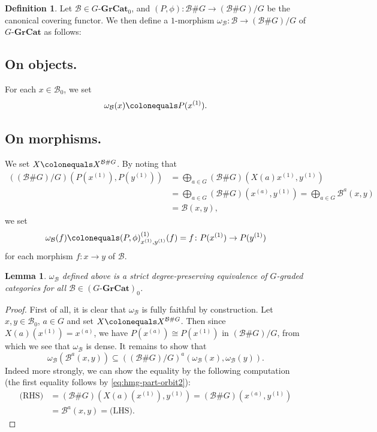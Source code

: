 \documentclass{surv-l}
\numberwithin{equation}{chapter}
\numberwithin{figure}{chapter}
\theoremstyle{plain}
\newtheorem{lem}[thm]{Lemma}
\theoremstyle{definition}
\newtheorem{dfn}[thm]{Definition}
\theoremstyle{remark}
\newcommand{\GGrCat}{G\text{-}\mathbf{GrCat}}
\begin{document}
\begin{dfn}
\label{dfn:omega}
Let $\mathcal{B}\in\GGrCat_0$, and
$(P,\phi)\colon\mathcal{B}\#G\to(\mathcal{B}\#G)/G$ be
the canonical covering functor.
We then define a $1$-morphism
$\omega_{\mathcal{B}}\colon\mathcal{B}\to(\mathcal{B}\#G)/G$
of $\GGrCat$ as follows:

\subsection*{On objects.}
For each $x\in\mathcal{B}_0$, we set
\[
\omega_{\mathcal{B}}(x)\colonequals P(x^{(1)}).
\]
\subsection*{On morphisms.}
We set
$X\colonequals  X^{\mathcal{B}\# G}$.
By noting that
\[
\begin{aligned}
((\mathcal{B}\# G)/G)(P(x^{(1)}), P(y^{(1)})) &=\bigoplus_{a \in G}(\mathcal{B}\# G)(X(a)x^{(1)}, y^{(1)})\\
&=\bigoplus_{a \in G}(\mathcal{B}\# G)(x^{(a)}, y^{(1)})
= \bigoplus_{a\in G} \mathcal{B}^{a}(x, y)\\
&= \mathcal{B}(x, y),
\end{aligned}
\]
we set
\[
\omega_{\mathcal{B}}(f)\colonequals  (P, \phi)_{x^{(1)},y^{(1)}}^{(1)}(f) = f
\colon P(x^{(1)}) \to P(y^{(1)})
\]
for each morphism $f\colon x\to y$ of $\mathcal{B}$.
\end{dfn}

\begin{lem}\label{lem:om_B-strict}
$\omega_{\mathcal{B}}$ defined above is a strict degree-preserving
equivalence of $G$-graded categories
for all $\mathcal{B} \in (\GGrCat)_0$.
\end{lem}

\begin{proof}
First of all, it is clear that $\omega_\mathcal{B}$ is fully faithful by construction.
Let $x, y \in \mathcal{B}_0$, $a \in G$ and set $X\colonequals  X^{\mathcal{B}\# G}$.
Then since $X(a)(x^{(1)}) = x^{(a)}$, we have
$P(x^{(a)}) \cong P(x^{(1)})$ in $(\mathcal{B}\# G)/G$, from which
we see that $\omega_\mathcal{B}$ is dense.
It remains to show that
\[
\omega_\mathcal{B}(\mathcal{B}^a(x, y)) \subseteq ((\mathcal{B}\# G)/G)^a(\omega_\mathcal{B}(x), \omega_\mathcal{B}(y)).
\]
Indeed more strongly, we can show the equality by the following computation
(the first equality follows by \eqref{eq:hmg-part-orbit2}):
\[
\begin{aligned}
\text{(RHS)} &=(\mathcal{B}\# G)(X(a)(x^{(1)}), y^{(1)}) = (\mathcal{B}\# G)(x^{(a)}, y^{(1)})\\
 &= \mathcal{B}^a(x, y)
= \text{(LHS)}.
\end{aligned}
\]
\end{proof}
\end{document}

